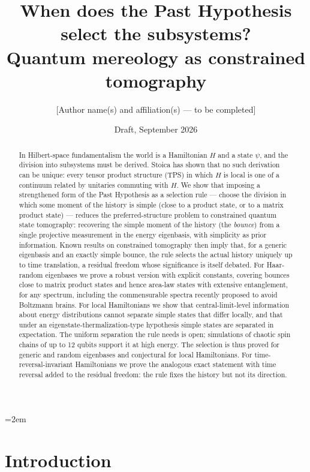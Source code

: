 \documentclass[11pt]{article}
\title{When does the Past Hypothesis select the subsystems?\\ Quantum mereology as constrained tomography}
\author{[Author name(s) and affiliation(s) --- to be completed]}
\date{Draft, September 2026}
\theoremstyle{definition}
\theoremstyle{remark}
\begin{document}
\emergencystretch=2em
\maketitle

\begin{abstract}
In Hilbert-space fundamentalism the world is a Hamiltonian $H$ and a state $\psi$, and the division into subsystems must be derived. Stoica has shown that no such derivation can be unique: every tensor product structure (TPS) in which $H$ is local is one of a continuum related by unitaries commuting with $H$. We show that imposing a strengthened form of the Past Hypothesis as a selection rule --- choose the division in which some moment of the history is simple (close to a product state, or to a matrix product state) --- reduces the preferred-structure problem to constrained quantum state tomography: recovering the simple moment of the history (the \emph{bounce}) from a single projective measurement in the energy eigenbasis, with simplicity as prior information. Known results on constrained tomography then imply that, for a generic eigenbasis and an exactly simple bounce, the rule selects the actual history uniquely up to time translation, a residual freedom whose significance is itself debated. For Haar-random eigenbases we prove a robust version with explicit constants, covering bounces close to matrix product states and hence area-law states with extensive entanglement, for any spectrum, including the commensurable spectra recently proposed to avoid Boltzmann brains. For local Hamiltonians we show that central-limit-level information about energy distributions cannot separate simple states that differ locally, and that under an eigenstate-thermalization-type hypothesis simple states are separated in expectation. The uniform separation the rule needs is open; simulations of chaotic spin chains of up to 12 qubits support it at high energy. The selection is thus proved for generic and random eigenbases and conjectural for local Hamiltonians. For time-reversal-invariant Hamiltonians we prove the analogous exact statement with time reversal added to the residual freedom: the rule fixes the history but not its direction.
\end{abstract}

\section{Introduction}
\label{sec:intro}
\end{document}
